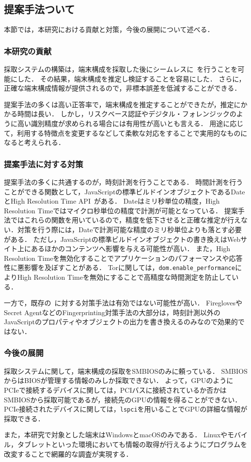 \subsection{提案手法ついて}
本節では，本研究における貢献と対策，今後の展開について述べる．

\subsubsection{本研究の貢献}
採取システムの構築は，端末構成を採取した後にシームレスに\hfp~を行うことを可能にした．
その結果，端末構成を推定し検証することを容易にした．
さらに，正確な端末構成情報が提供されるので，非標本誤差を低減することができる．

提案手法の多くは高い正答率で，端末構成を推定することができたが，推定にかかる時間は長い．
しかし，リスクベース認証やデジタル・フォレンジックのように高い識別精度が求められる場合には有用性が高いとも言える．
用途に応じて，利用する特徴点を変更するなどして柔軟な対応をすることで実用的なものになると考えられる．

\subsubsection{提案手法に対する対策}
提案手法の多くに共通するのが，時刻計測を行うことである．
時間計測を行うことができる関数として，JavaScriptの標準ビルドインオブジェクトであるDateとHigh Resolution Time API~\cite{high_res_time}がある．
Dateはミリ秒単位の精度，High Resolution Timeではマイクロ秒単位の精度で計測が可能となっている．
提案手法ではこれらの関数を用いているので，精度を低下させると正確な推定が行えない．対策を行う際には，Dateで計測可能な精度のミリ秒単位よりも落とす必要がある．
ただし，JavaScriptの標準ビルドインオブジェクトの書き換えはWebサイト上にあるほかのコンテンツへ影響を与える可能性が高い．
また，High Resolution Timeを無効化することでアプリケーションのパフォーマンスや応答性に悪影響を及ぼすことがある．
Torに関しては，\texttt{dom.enable\_performance}によりHigh Resolution Timeを無効にすることで高精度な時間測定を防止している．

一方で，既存の\fp~に対する対策手法は有効ではない可能性が高い．
FireglovesやSecret AgentなどのFingerprinting対策手法の大部分は，時刻計測以外のJavaScriptのプロパティやオブジェクトの出力を書き換えるのみなので効果的ではない．

\subsubsection{今後の展開}
採取システムに関して，端末構成の採取をSMBIOSのみに頼っている．
SMBIOSからはBIOSが管理する情報のみしか採取できない．
よって，GPUのようにPCIeで接続するデバイスに関しては，PCIバスに接続されているか否かはSMBIOSから採取可能であるが，接続先のGPUの情報を得ることができない．
PCIe接続されたデバイスに関しては，\texttt{lspci}を用いることでGPUの詳細な情報が採取できる．

また，本研究で対象とした端末はWindowsとmacOSのみである．
Linuxやモバイル，タブレットといった環境においても情報の取得が行えるようにプログラムを改変することで網羅的な調査が実現する．
